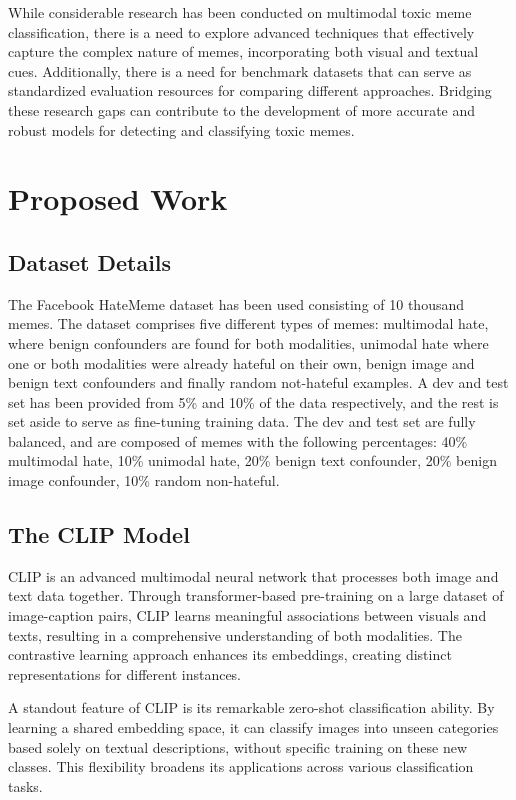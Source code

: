 \documentclass{ieeeaccess}
\begin{document}
While considerable research has been conducted on multimodal toxic meme classification, there is a need to explore advanced techniques that effectively capture the complex nature of memes, incorporating both visual and textual cues. Additionally, there is a need for benchmark datasets that can serve as standardized evaluation resources for comparing different approaches. Bridging these research gaps can contribute to the development of more accurate and robust models for detecting and classifying toxic memes.

\section{Proposed Work}
\label{sec:proposed}

\subsection{Dataset Details}
The Facebook HateMeme dataset has been used consisting of 10 thousand memes. The dataset comprises five different types of memes: multimodal hate, where benign confounders are found for both modalities, unimodal hate where one or both modalities were already hateful on their own, benign image and benign text confounders and finally random not-hateful examples. A dev and test set has been provided from 5\% and 10\% of the data respectively, and the rest is set aside to serve as fine-tuning training data. The dev and test set are fully balanced, and are composed of memes with the following percentages: 40\% multimodal hate, 10\% unimodal hate, 20\% benign text confounder, 20\% benign image confounder, 10\% random non-hateful.

\subsection{The CLIP Model}
CLIP is an advanced multimodal neural network that processes both image and text data together. Through transformer-based pre-training on a large dataset of image-caption pairs, CLIP learns meaningful associations between visuals and texts, resulting in a comprehensive understanding of both modalities. The contrastive learning approach enhances its embeddings, creating distinct representations for different instances.

A standout feature of CLIP is its remarkable zero-shot classification ability. By learning a shared embedding space, it can classify images into unseen categories based solely on textual descriptions, without specific training on these new classes. This flexibility broadens its applications across various classification tasks.
\end{document}
